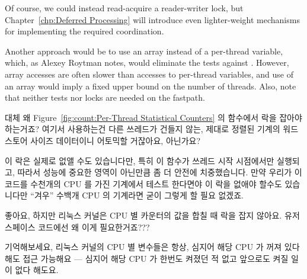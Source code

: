 \begin{enumerate}
	Of course, we could instead read-acquire a reader-writer lock,
	but Chapter~\ref{chp:Deferred Processing} will introduce even
	lighter-weight mechanisms for implementing the required coordination.

	Another approach would be to use an array instead of a per-thread
	variable, which, as Alexey Roytman notes, would eliminate
	the tests against .
	However, array accesses are often slower than accesses to
	per-thread variables, and use of an array would imply a
	fixed upper bound on the number of threads.
	Also, note that neither tests nor locks are needed on the
	 fastpath.
	\fi

\QuickQ{}
	대체 왜 Figure~\ref{fig:count:Per-Thread Statistical Counters} 의
	 함수에서 락을 잡아야 하는거죠?
	여기서 사용하는건 다른 쓰레드가 건들지 않는, 제대로 정렬된 기계의 워드
	스토어 사이즈 데이터이니 어토믹할 거잖아요, 아닌가요?

\QuickA{}
	이 락은 실제로 없앨 수도 있습니다만, 특히 이 함수가 쓰레드 시작
	시점에서만 실행되고, 따라서 성능에 중요한 영역이 아닌만큼 좀 더 안전에
	치중했습니다.
	만약 우리가 이 코드를 수천개의 CPU 를 가진 기계에서 테스트 한다면야 이
	락을 없애야 할수도 있습니다만 ``겨우'' 수백개 CPU 의 기계라면 굳이
	그렇게 할 필요 없겠죠.

\QuickQ{}
	좋아요, 하지만 리눅스 커널은 CPU 별 카운터의 값을 합칠 때 락을 잡지
	않아요.
	유저 스페이스 코드에선 왜 이게 필요한거죠???

\QuickA{}
	기억해보세요, 리눅스 커널의 CPU 별 변수들은 항상, 심지어 해당 CPU 가
	꺼져 있다 해도 접근 가능해요 --- 심지어 해당 CPU 가 한번도 켜졌던 적
	없고 앞으로도 켜질 일이 없다 해도요.
	\iffalse


\end{enumerate}
